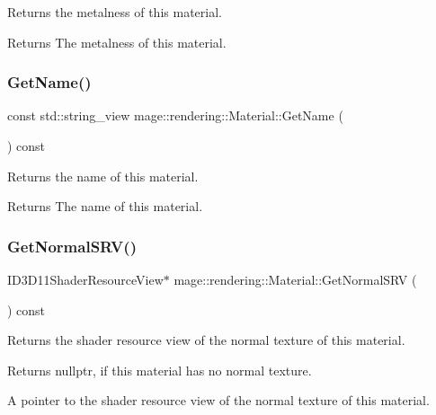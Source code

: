 Returns the metalness of this material.

\begin{DoxyReturn}{Returns}
The metalness of this material. 
\end{DoxyReturn}
\mbox{\label{classmage_1_1rendering_1_1_material_a0dcfe76cd03607242f6d2ceaccb83f5b}} 
\subsubsection{\texorpdfstring{Get\+Name()}{GetName()}}
{\footnotesize\ttfamily const std\+::string\+\_\+view mage\+::rendering\+::\+Material\+::\+Get\+Name (\begin{DoxyParamCaption}{ }\end{DoxyParamCaption}) const\hspace{0.3cm}{\ttfamily [noexcept]}}

Returns the name of this material.

\begin{DoxyReturn}{Returns}
The name of this material. 
\end{DoxyReturn}
\mbox{\label{classmage_1_1rendering_1_1_material_a8617392cee8e8609671be3f4147a5934}} 
\subsubsection{\texorpdfstring{Get\+Normal\+S\+R\+V()}{GetNormalSRV()}}
{\footnotesize\ttfamily I\+D3\+D11\+Shader\+Resource\+View$\ast$ mage\+::rendering\+::\+Material\+::\+Get\+Normal\+S\+RV (\begin{DoxyParamCaption}{ }\end{DoxyParamCaption}) const\hspace{0.3cm}{\ttfamily [noexcept]}}

Returns the shader resource view of the normal texture of this material.

\begin{DoxyReturn}{Returns}
{\ttfamily nullptr}, if this material has no normal texture. 

A pointer to the shader resource view of the normal texture of this material. 
\end{DoxyReturn}
\mbox{\label{classmage_1_1rendering_1_1_material_a1ae7786ebd627d3e7ecaf2dc671f497d}} 
